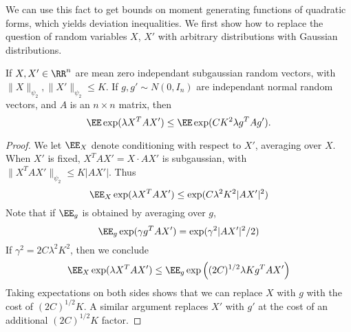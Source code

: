 We can use this fact to get bounds on moment generating functions of quadratic forms, which yields deviation inequalities. We first show how to replace the question of random variables $X$, $X'$ with arbitrary distributions with Gaussian distributions.

\begin{lemma}
    If $X,X' \in \RR^n$ are mean zero independant subgaussian random vectors, with $\| X \|_{\psi_2}, \| X' \|_{\psi_2} \leq K$. If $g,g' \sim N(0,I_n)$ are independant normal random vectors, and $A$ is an $n \times n$ matrix, then
    \[ \EE \exp(\lambda X^T A X') \leq \EE \exp(C K^2 \lambda g^T A g'). \]
\end{lemma}
\begin{proof}
    We let $\EE_X$ denote conditioning with respect to $X'$, averaging over $X$. When $X'$ is fixed, $X^T A X' = X \cdot AX'$ is subgaussian, with $\| X^T A X' \|_{\psi_2} \leq K |AX'|$. Thus
    \[ \EE_X \exp(\lambda X^T A X') \leq \exp(C \lambda^2 K^2 |AX'|^2) \]
    Note that if $\EE_g$ is obtained by averaging over $g$,
    \[ \EE_g \exp(\gamma g^T A X') = \exp(\gamma^2 |AX'|^2/2) \]
    If $\gamma^2 = 2C \lambda^2 K^2$, then we conclude
    \[ \EE_X \exp(\lambda X^T A X') \leq \EE_g \exp \left( (2C)^{1/2} \lambda K g^T A X' \right) \]
    Taking expectations on both sides shows that we can replace $X$ with $g$ with the cost of $(2C)^{1/2} K$. A similar argument replaces $X'$ with $g'$ at the cost of an additional $(2C)^{1/2} K$ factor.
\end{proof}

